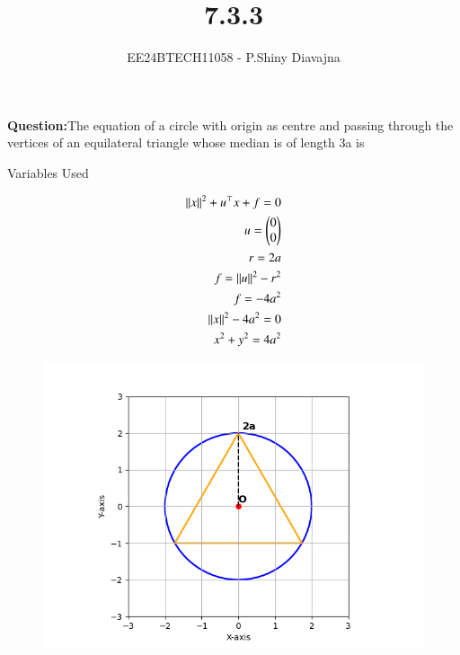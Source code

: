 \documentclass[journal]{IEEEtran}
\begin{document}

\vspace{3cm}

\title{7.3.3}
\author{EE24BTECH11058 - P.Shiny Diavajna}
{\let\newpage\relax\maketitle}

\renewcommand{\thefigure}{\theenumi}
\renewcommand{\thetable}{\theenumi}
\setlength{\intextsep}{10pt} %


\renewcommand{\thetable}{\theenumi}

\textbf{Question:}The equation of a circle with origin as centre and passing through the vertices of an equilateral triangle whose median is of length 3a is \\


   \solution
   \begin{table}[h!]    
     \centering
     
     \caption{Variables Used}
     \label{}
   \end{table}

    \begin{align}
	   {\left\lVert x\right\rVert} ^ 2 + {u}^\top x + f =0\\
	   u = \begin{pmatrix}0\\ 0\end{pmatrix}\\
      r = 2a\\
	   f = {\left\lVert u\right\rVert}^2 - {r}^2 \\
	   f = -4 {a} ^2\\
	    {\left\lVert x\right\rVert} ^ 2 - 4a ^2 =0\\
	   x^2 + y^2 = 4a^2\\
	     \end{align}	
	  
    \begin{figure}[h]
    \centering
    \includegraphics[width=\columnwidth]{figs/Figure_1.png}
 \end{figure}
\end{document}
